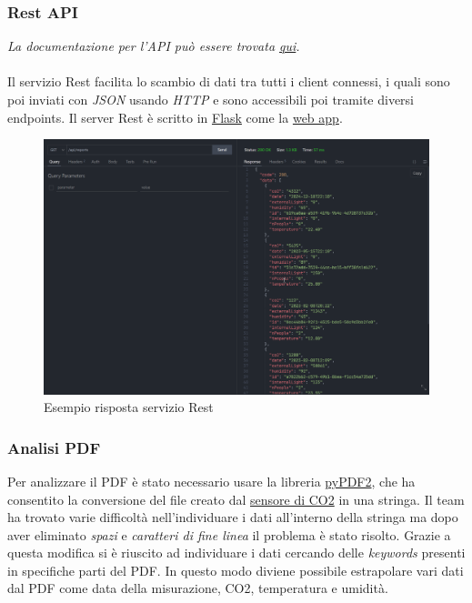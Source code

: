 \documentclass{optica-article}
\begin{document}
\vspace{8pt}
\subsubsection{Rest API}\label{sec:domotics_rest_api}
\textit{La documentazione per l'API può essere trovata \href{https://naonexus.notion.site/Domotics-server-22721767d69a43a6badeafcaf546b3d2}{qui}.}\\
\\Il servizio Rest facilita lo scambio di dati tra tutti i client connessi, i quali sono poi inviati con \emph{JSON} usando \emph{HTTP} e sono accessibili poi tramite diversi endpoints. Il server Rest è scritto in  \href{https://flask.palletsprojects.com/en/2.2.x/}{Flask} come la \hyperref[sec:domotics_web_app]{web app}.


\begin{figure}[H]
    \centering
    \includegraphics[scale=0.36]{figures/sample_api_response.png}
    \caption{Esempio risposta servizio Rest}
    \label{fig:rest_api_reponse}
\end{figure}


\vspace{8pt}
\subsubsection{Analisi PDF}\label{sec:domotics_pdf_analysis}
Per analizzare il PDF è stato necessario usare la libreria \href{https://pypdf2.readthedocs.io/en/3.0.0/}{pyPDF2}, che ha consentito la conversione del file creato dal \hyperref[sec:domotics_sensor]{sensore di CO2} in una stringa. Il team ha trovato varie difficoltà nell'individuare i dati all'interno della stringa ma dopo aver eliminato \emph{spazi} e \emph{caratteri di fine linea} il problema è stato risolto. Grazie a questa modifica si è riuscito ad individuare i dati cercando delle \emph{keywords} presenti in specifiche parti del PDF. In questo modo diviene possibile estrapolare vari dati dal PDF come data della misurazione, CO2, temperatura e umidità.
\end{document}
